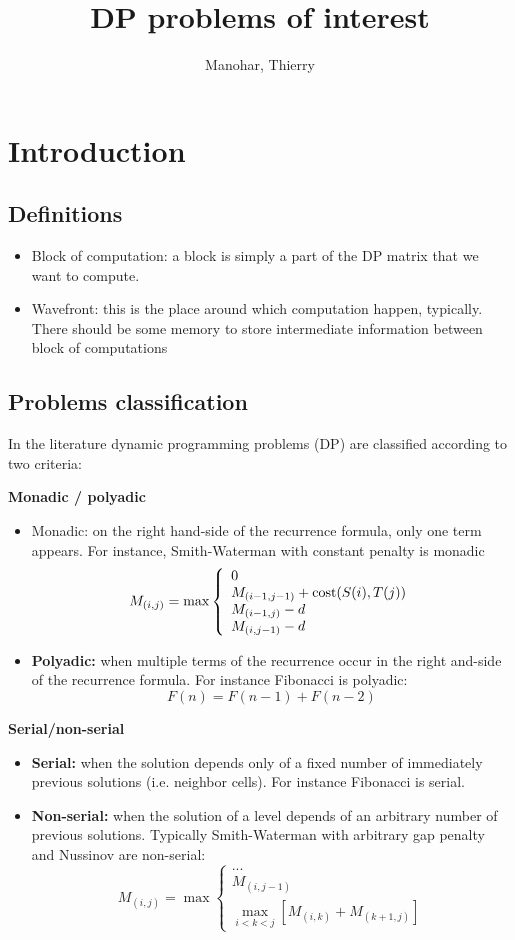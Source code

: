 \documentclass[11pt]{article}
\title{DP problems of interest}
\author{Manohar, Thierry}
\date{}
\def\ul{\begin{itemize}}
\def\ule{\end{itemize}}
\begin{document}
\maketitle
\pagestyle{headings}

\section{Introduction}
\subsection{Definitions}\ul
\item Block of computation: a block is simply a part of the DP matrix that we want to compute.
\item Wavefront: this is the place around which computation happen, typically. There should be some memory to store intermediate information between block of computations
\ule

\subsection{Problems classification}
In the literature dynamic programming problems (DP) are classified according to two criteria:

\textbf{Monadic / polyadic}\ul
\item Monadic: on the right hand-side of the recurrence formula, only one term appears. For instance, Smith-Waterman with constant penalty is monadic
	\[M_{(i,j)}=\max\left\{\begin{array}{l} 0 \\ M_{(i-1,j-1)}+{\rm cost}(S(i),T(j))\\ M_{(i-1,j)}-d\\ M_{(i,j-1)}-d \end{array}\right. \]
\item \textbf{Polyadic:} when multiple terms of the recurrence occur in the right and-side of the recurrence formula. For instance Fibonacci is polyadic: \[F(n) = F(n-1) + F(n-2)\]
\ule

\textbf{Serial/non-serial} \ul
\item \textbf{Serial:} when the solution depends only of a fixed number of immediately previous solutions (i.e. neighbor cells). For instance Fibonacci is serial.
\item \textbf{Non-serial:} when the solution of a level depends of an arbitrary number of previous solutions. Typically Smith-Waterman with arbitrary gap penalty and Nussinov are non-serial:
	\[M_{(i,j)}=\max\left\{\begin{array}{l} ... \\ M_{(i,j-1)}\\ \max\limits_{i<k<j} [ M_{(i,k)}+M_{(k+1,j)} ] \end{array}\right. \]
\ule
\end{document}
